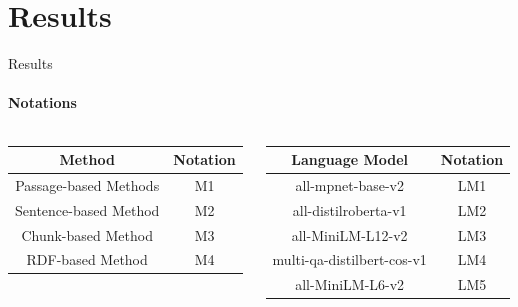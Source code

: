 \documentclass[aspectratio=169]{beamer}
\begin{document}
\section{Results}
\begin{frame}{Results}
	\framesubtitle{Notations}
	\begin{columns}
		\begin{column}{0.5\textwidth}
			\begin{table}
				\centering
				\begin{tabular}{|c|c|}
					\hline
					Method & Notation\\
					\hline
					Passage-based Methods & M1\\
					\hline
					Sentence-based Method & M2\\
					\hline
					Chunk-based Method & M3\\
					\hline
					RDF-based Method & M4\\
					\hline
				\end{tabular}
			\end{table}
		\end{column}
	\begin{column}{0.5\textwidth}
		\begin{table}
			\centering
			\begin{tabular}{|c|c|}
				\hline
				Language Model & Notation\\
				\hline
				all-mpnet-base-v2 & LM1\\
				\hline
				all-distilroberta-v1 & LM2\\
				\hline
				all-MiniLM-L12-v2 & LM3\\
				\hline
				multi-qa-distilbert-cos-v1 & LM4\\
				\hline
				all-MiniLM-L6-v2 & LM5\\
				\hline
				
			\end{tabular}
		\end{table}
	\end{column}
	\end{columns}
	
\end{frame}
\end{document}
